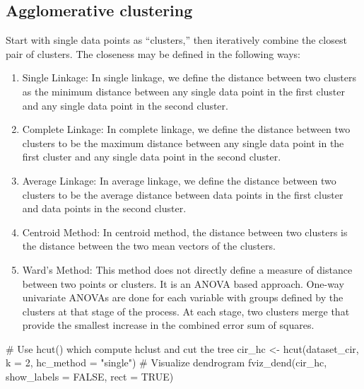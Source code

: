 \documentclass[
  letterpaper,
  DIV=11,
  numbers=noendperiod]{scrreprt}
\newenvironment{Shaded}{\begin{snugshade}}{\end{snugshade}}
\newcommand{\AttributeTok}[1]{\textcolor[rgb]{0.40,0.45,0.13}{#1}}
\newcommand{\CommentTok}[1]{\textcolor[rgb]{0.37,0.37,0.37}{#1}}
\newcommand{\ConstantTok}[1]{\textcolor[rgb]{0.56,0.35,0.01}{#1}}
\newcommand{\DecValTok}[1]{\textcolor[rgb]{0.68,0.00,0.00}{#1}}
\newcommand{\FunctionTok}[1]{\textcolor[rgb]{0.28,0.35,0.67}{#1}}
\newcommand{\NormalTok}[1]{\textcolor[rgb]{0.00,0.23,0.31}{#1}}
\newcommand{\OtherTok}[1]{\textcolor[rgb]{0.00,0.23,0.31}{#1}}
\newcommand{\StringTok}[1]{\textcolor[rgb]{0.13,0.47,0.30}{#1}}
\begin{document}
\hypertarget{agglomerative-clustering}{%
\subsection{Agglomerative clustering}\label{agglomerative-clustering}}

Start with single data points as ``clusters,'' then iteratively combine
the closest pair of clusters. The closeness may be defined in the
following ways:

\begin{enumerate}
\def\labelenumi{\arabic{enumi}.}
\item
  Single Linkage: In single linkage, we define the distance between two
  clusters as the minimum distance between any single data point in the
  first cluster and any single data point in the second cluster.
\item
  Complete Linkage: In complete linkage, we define the distance between
  two clusters to be the maximum distance between any single data point
  in the first cluster and any single data point in the second cluster.
\item
  Average Linkage: In average linkage, we define the distance between
  two clusters to be the average distance between data points in the
  first cluster and data points in the second cluster.
\item
  Centroid Method: In centroid method, the distance between two clusters
  is the distance between the two mean vectors of the clusters.
\item
  Ward's Method: This method does not directly define a measure of
  distance between two points or clusters. It is an ANOVA based
  approach. One-way univariate ANOVAs are done for each variable with
  groups defined by the clusters at that stage of the process. At each
  stage, two clusters merge that provide the smallest increase in the
  combined error sum of squares.
\end{enumerate}

\begin{Shaded}
\begin{Highlighting}[]
\CommentTok{\# Use hcut() which compute hclust and cut the tree}
\NormalTok{cir\_hc }\OtherTok{\textless{}{-}} \FunctionTok{hcut}\NormalTok{(dataset\_cir, }\AttributeTok{k =} \DecValTok{2}\NormalTok{, }\AttributeTok{hc\_method =} \StringTok{"single"}\NormalTok{)}
\CommentTok{\# Visualize dendrogram}
\FunctionTok{fviz\_dend}\NormalTok{(cir\_hc, }\AttributeTok{show\_labels =} \ConstantTok{FALSE}\NormalTok{, }\AttributeTok{rect =} \ConstantTok{TRUE}\NormalTok{)}
\end{Highlighting}
\end{Shaded}
\end{document}

